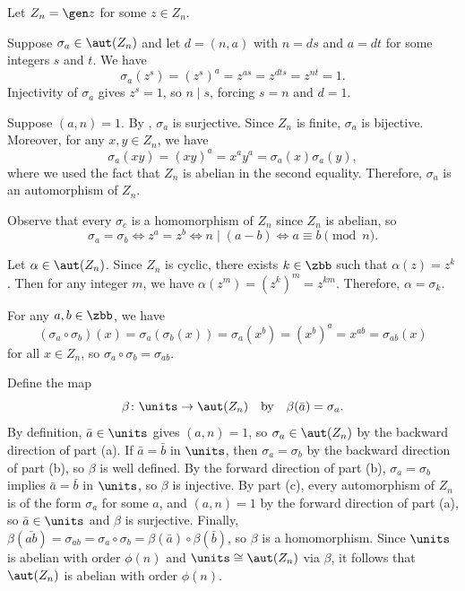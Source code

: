 \begin{sol}
    Let $Z_n = \gen z$ for some $z \in Z_n$.
    \begin{subexercises}
        \item \rightimp Suppose $\sigma_a \in \aut(Z_n)$ and let $d = (n, a)$ with $n = ds$ and $a = dt$ for some integers $s$ and $t$.
        We have
        \[
            \sigma_a(z^s) = (z^s)^a = z^{as} = z^{dts} = z^{nt} = 1.
        \]
        Injectivity of $\sigma_a$ gives $z^s = 1$, so $n \mid s$, forcing $s = n$ and $d = 1$.

        \leftimp Suppose $(a, n) = 1$.
        By , $\sigma_a$ is surjective.
        Since $Z_n$ is finite, $\sigma_a$ is bijective.
        Moreover, for any $x, y \in Z_n$, we have
        \[
            \sigma_a(xy) = (xy)^a = x^a y^a = \sigma_a(x) \sigma_a(y),
        \]
        where we used the fact that $Z_n$ is abelian in the second equality.
        Therefore, $\sigma_a$ is an automorphism of $Z_n$.
        \item Observe that every $\sigma_c$ is a homomorphism of $Z_n$ since $Z_n$ is abelian, so
        \[
            \sigma_a = \sigma_b
            \iff z^a = z^b
            \iff n \mid (a - b) 
            \iff a \equiv b \pmod n.
        \]
        \item Let $\alpha \in \aut(Z_n)$.
        Since $Z_n$ is cyclic, there exists $k \in \zbb$ such that $\alpha(z) = z^k$.
        Then for any integer $m$, we have $\alpha(z^m) = (z^k)^m = z^{km}$.
        Therefore, $\alpha = \sigma_k$.
        \item For any $a, b \in \zbb$, we have
        \[
            (\sigma_a \circ \sigma_b)(x) = \sigma_a(\sigma_b(x)) = \sigma_a(x^b) = (x^b)^a = x^{ab} = \sigma_{ab}(x)
        \]
        for all $x \in Z_n$, so $\sigma_a \circ \sigma_b = \sigma_{ab}$.

        Define the map
        \[
            \beta \colon \units \to \aut(Z_n) \quad \text{by} \quad \beta(\bar a) = \sigma_a.
        \]
        By definition, $\bar a \in \units$ gives $(a, n) = 1$, so $\sigma_a \in \aut(Z_n)$ by the backward direction of part (a).
        If $\bar a = \bar b$ in $\units$, then $\sigma_a = \sigma_b$ by the backward direction of part (b), so $\beta$ is well defined.
        By the forward direction of part (b), $\sigma_a = \sigma_b$ implies $\bar a = \bar b$ in $\units$, so $\beta$ is injective.
        By part (c), every automorphism of $Z_n$ is of the form $\sigma_a$ for some $a$, and $(a, n) = 1$ by the forward direction of part (a), so $\bar a \in \units$ and $\beta$ is surjective.
        Finally, $\beta(\bar{ab}) = \sigma_{ab} = \sigma_a \circ \sigma_b = \beta(\bar a) \circ \beta(\bar b)$, so $\beta$ is a homomorphism.
        Since $\units$ is abelian with order $\phi(n)$ and $\units \cong \aut(Z_n)$ via $\beta$, it follows that $\aut(Z_n)$ is abelian with order $\phi(n)$. \qedhere
    \end{subexercises}
\end{sol}